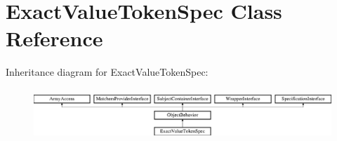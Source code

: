 \section{Exact\+Value\+Token\+Spec Class Reference}
\label{classspec_1_1_prophecy_1_1_argument_1_1_token_1_1_exact_value_token_spec}
Inheritance diagram for Exact\+Value\+Token\+Spec\+:\begin{figure}[H]
\begin{center}
\leavevmode
\includegraphics[height=1.953488cm]{classspec_1_1_prophecy_1_1_argument_1_1_token_1_1_exact_value_token_spec}
\end{center}
\end{figure}
